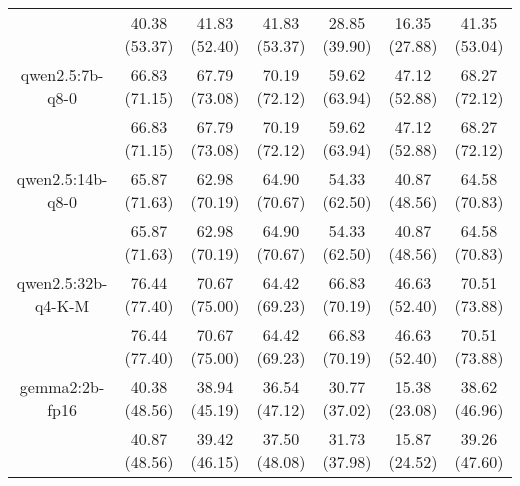 \begin{table}[]
{\begin{tabular}{ccccccc}
        

        \multicolumn{1}{c|}{} & 40.38 (53.37) & 41.83 (52.40) & \multicolumn{1}{c|}{41.83 (53.37)} & 28.85 (39.90) & \multicolumn{1}{c|}{16.35 (27.88)} & 41.35 (53.04) \\
        \cline{1-7}
        

        \multicolumn{1}{c|}{qwen2.5:7b-q8-0} & 66.83 (71.15) & 67.79 (73.08) & \multicolumn{1}{c|}{70.19 (72.12)} & 59.62 (63.94) & \multicolumn{1}{c|}{47.12 (52.88)} & 68.27 (72.12) \\
        
        

        \multicolumn{1}{c|}{} & 66.83 (71.15) & 67.79 (73.08) & \multicolumn{1}{c|}{70.19 (72.12)} & 59.62 (63.94) & \multicolumn{1}{c|}{47.12 (52.88)} & 68.27 (72.12) \\
        \cline{1-7}
        

        \multicolumn{1}{c|}{qwen2.5:14b-q8-0} & 65.87 (71.63) & 62.98 (70.19) & \multicolumn{1}{c|}{64.90 (70.67)} & 54.33 (62.50) & \multicolumn{1}{c|}{40.87 (48.56)} & 64.58 (70.83) \\
        
        

        \multicolumn{1}{c|}{} & 65.87 (71.63) & 62.98 (70.19) & \multicolumn{1}{c|}{64.90 (70.67)} & 54.33 (62.50) & \multicolumn{1}{c|}{40.87 (48.56)} & 64.58 (70.83) \\
        \cline{1-7}
        

        \multicolumn{1}{c|}{qwen2.5:32b-q4-K-M} & 76.44 (77.40) & 70.67 (75.00) & \multicolumn{1}{c|}{64.42 (69.23)} & 66.83 (70.19) & \multicolumn{1}{c|}{46.63 (52.40)} & 70.51 (73.88) \\
        
        

        \multicolumn{1}{c|}{} & 76.44 (77.40) & 70.67 (75.00) & \multicolumn{1}{c|}{64.42 (69.23)} & 66.83 (70.19) & \multicolumn{1}{c|}{46.63 (52.40)} & 70.51 (73.88) \\
        \cline{1-7}
        

        \multicolumn{1}{c|}{gemma2:2b-fp16} & 40.38 (48.56) & 38.94 (45.19) & \multicolumn{1}{c|}{36.54 (47.12)} & 30.77 (37.02) & \multicolumn{1}{c|}{15.38 (23.08)} & 38.62 (46.96) \\
        
        

        \multicolumn{1}{c|}{} & 40.87 (48.56) & 39.42 (46.15) & \multicolumn{1}{c|}{37.50 (48.08)} & 31.73 (37.98) & \multicolumn{1}{c|}{15.87 (24.52)} & 39.26 (47.60) \\
        \cline{1-7}
        


\end{tabular}}
\end{table}
